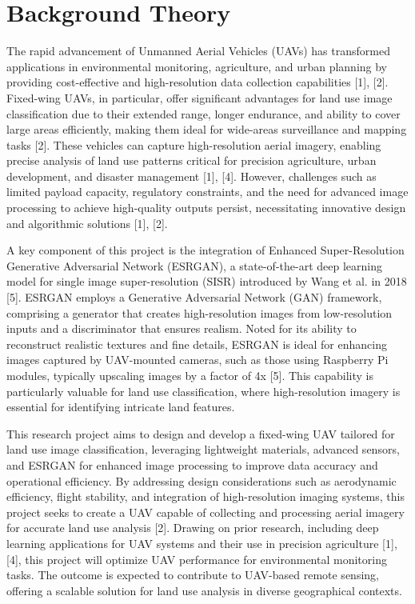 \section{Background Theory}
The rapid advancement of Unmanned Aerial Vehicles (UAVs) has transformed applications in environmental monitoring, agriculture, and urban planning by providing cost-effective and high-resolution data collection capabilities [1], [2]. Fixed-wing UAVs, in particular, offer significant advantages for land use image classification due to their extended range, longer endurance, and ability to cover large areas efficiently, making them ideal for wide-areas surveillance and mapping tasks [2]. These vehicles can capture high-resolution aerial imagery, enabling precise analysis of land use patterns critical for precision agriculture, urban development, and disaster management [1], [4]. However, challenges such as limited payload capacity, regulatory constraints, and the need for advanced image processing to achieve high-quality outputs persist, necessitating innovative design and algorithmic solutions [1], [2].

A key component of this project is the integration of Enhanced Super-Resolution Generative Adversarial Network (ESRGAN), a state-of-the-art deep learning model for single image super-resolution (SISR) introduced by Wang et al. in 2018 [5]. ESRGAN employs a Generative Adversarial Network (GAN) framework, comprising a generator that creates high-resolution images from low-resolution inputs and a discriminator that ensures realism. Noted for its ability to reconstruct realistic textures and fine details, ESRGAN is ideal for enhancing images captured by UAV-mounted cameras, such as those using Raspberry Pi modules, typically upscaling images by a factor of 4x [5]. This capability is particularly valuable for land use classification, where high-resolution imagery is essential for identifying intricate land features.

This research project aims to design and develop a fixed-wing UAV tailored for land use image classification, leveraging lightweight materials, advanced sensors, and ESRGAN for enhanced image processing to improve data accuracy and operational efficiency. By addressing design considerations such as aerodynamic efficiency, flight stability, and integration of high-resolution imaging systems, this project seeks to create a UAV capable of collecting and processing aerial imagery for accurate land use analysis [2]. Drawing on prior research, including deep learning applications for UAV systems and their use in precision agriculture [1], [4], this project will optimize UAV performance for environmental monitoring tasks. The outcome is expected to contribute to UAV-based remote sensing, offering a scalable solution for land use analysis in diverse geographical contexts.

